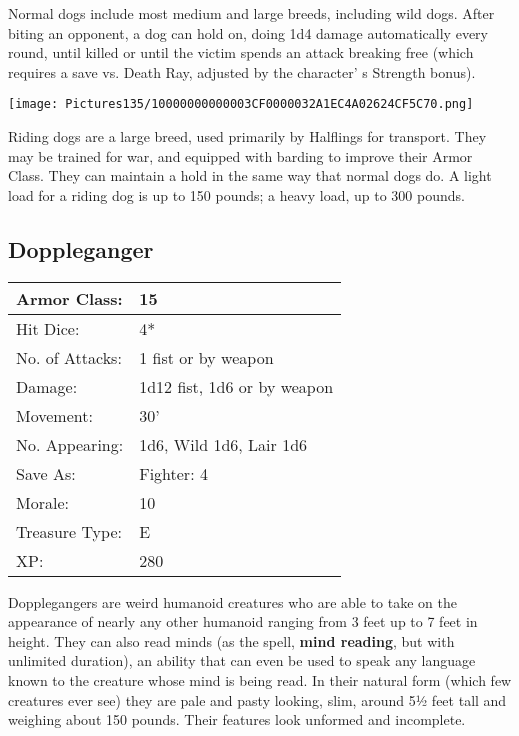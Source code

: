 \documentclass[a4paper,twoside,openany,10pt]{book}
\begin{document}
\begin{multicols}{2}
Normal dogs include most medium and large breeds, including wild dogs. After biting an opponent, a dog can hold on, doing 1d4 damage automatically every round, until killed or until the victim spends an attack breaking free (which requires a save vs. Death Ray, adjusted by the character' s Strength bonus).


\begin{center}
	\texttt{[image: Pictures135/10000000000003CF0000032A1EC4A02624CF5C70.png]}
\end{center}

Riding dogs are a large breed, used primarily by Halflings for transport. They may be trained for war, and equipped with barding to improve their Armor Class. They can maintain a hold in the same way that normal dogs do. A light load for a riding dog is up to 150 pounds; a heavy load, up to 300 pounds.

\subsection*{Doppleganger}\label{doppleganger}


\begin{tabularx}{0.48\textwidth}{@{}lX@{}}
Armor Class: & 15 \\\hline
Hit Dice: & 4* \\\hline
No. of Attacks: & 1 fist or by weapon \\\hline
Damage: & 1d12 fist, 1d6 or by weapon \\\hline
Movement: & 30' \\\hline
No. Appearing: & 1d6, Wild 1d6, Lair 1d6 \\\hline
Save As: & Fighter: 4 \\\hline
Morale: & 10 \\\hline
Treasure Type: & E \\\hline
XP: & 280 \\\hline
\end{tabularx}\medskip

Dopplegangers are weird humanoid creatures who are able to take on the appearance of nearly any other humanoid ranging from 3 feet up to 7 feet in height. They can also read minds (as the spell, \textbf{mind reading}, but with unlimited duration), an ability that can even be used to speak any language known to the creature whose mind is being read. In their natural form (which few creatures ever see) they are pale and pasty looking, slim, around 5½ feet tall and weighing about 150 pounds. Their features look unformed and incomplete.


\end{multicols}
\end{document}
